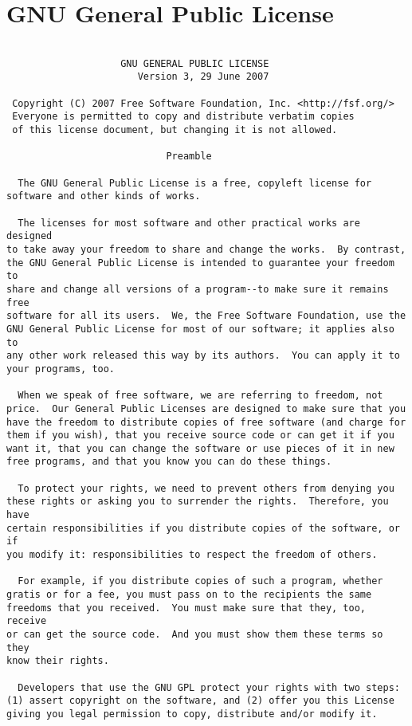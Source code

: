 \section{GNU General Public License}
\begin{verbatim}

                    GNU GENERAL PUBLIC LICENSE
                       Version 3, 29 June 2007

 Copyright (C) 2007 Free Software Foundation, Inc. <http://fsf.org/>
 Everyone is permitted to copy and distribute verbatim copies
 of this license document, but changing it is not allowed.

                            Preamble

  The GNU General Public License is a free, copyleft license for
software and other kinds of works.

  The licenses for most software and other practical works are designed
to take away your freedom to share and change the works.  By contrast,
the GNU General Public License is intended to guarantee your freedom to
share and change all versions of a program--to make sure it remains free
software for all its users.  We, the Free Software Foundation, use the
GNU General Public License for most of our software; it applies also to
any other work released this way by its authors.  You can apply it to
your programs, too.

  When we speak of free software, we are referring to freedom, not
price.  Our General Public Licenses are designed to make sure that you
have the freedom to distribute copies of free software (and charge for
them if you wish), that you receive source code or can get it if you
want it, that you can change the software or use pieces of it in new
free programs, and that you know you can do these things.

  To protect your rights, we need to prevent others from denying you
these rights or asking you to surrender the rights.  Therefore, you have
certain responsibilities if you distribute copies of the software, or if
you modify it: responsibilities to respect the freedom of others.

  For example, if you distribute copies of such a program, whether
gratis or for a fee, you must pass on to the recipients the same
freedoms that you received.  You must make sure that they, too, receive
or can get the source code.  And you must show them these terms so they
know their rights.

  Developers that use the GNU GPL protect your rights with two steps:
(1) assert copyright on the software, and (2) offer you this License
giving you legal permission to copy, distribute and/or modify it.


\end{verbatim}
